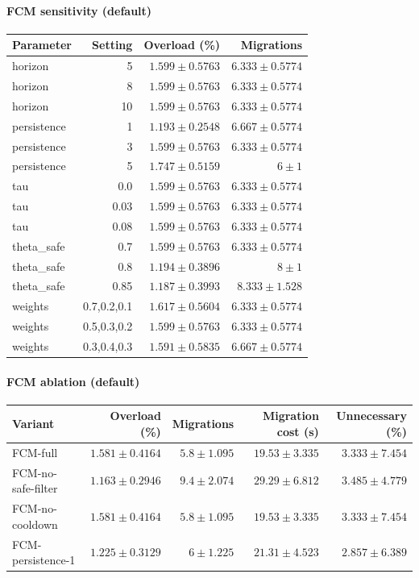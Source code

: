 \paragraph{FCM sensitivity (default)}
\begin{tabular}{lrrr}
\hline
Parameter & Setting & Overload (\%) & Migrations \\
\hline
horizon & 5 & $1.599 \pm 0.5763$ & $6.333 \pm 0.5774$ \\
horizon & 8 & $1.599 \pm 0.5763$ & $6.333 \pm 0.5774$ \\
horizon & 10 & $1.599 \pm 0.5763$ & $6.333 \pm 0.5774$ \\
persistence & 1 & $1.193 \pm 0.2548$ & $6.667 \pm 0.5774$ \\
persistence & 3 & $1.599 \pm 0.5763$ & $6.333 \pm 0.5774$ \\
persistence & 5 & $1.747 \pm 0.5159$ & $6 \pm 1$ \\
tau & 0.0 & $1.599 \pm 0.5763$ & $6.333 \pm 0.5774$ \\
tau & 0.03 & $1.599 \pm 0.5763$ & $6.333 \pm 0.5774$ \\
tau & 0.08 & $1.599 \pm 0.5763$ & $6.333 \pm 0.5774$ \\
theta_safe & 0.7 & $1.599 \pm 0.5763$ & $6.333 \pm 0.5774$ \\
theta_safe & 0.8 & $1.194 \pm 0.3896$ & $8 \pm 1$ \\
theta_safe & 0.85 & $1.187 \pm 0.3993$ & $8.333 \pm 1.528$ \\
weights & 0.7,0.2,0.1 & $1.617 \pm 0.5604$ & $6.333 \pm 0.5774$ \\
weights & 0.5,0.3,0.2 & $1.599 \pm 0.5763$ & $6.333 \pm 0.5774$ \\
weights & 0.3,0.4,0.3 & $1.591 \pm 0.5835$ & $6.667 \pm 0.5774$ \\
\hline
\end{tabular}


\paragraph{FCM ablation (default)}
\begin{tabular}{lrrrr}
\hline
Variant & Overload (\%) & Migrations & Migration cost (s) & Unnecessary (\%) \\
\hline
FCM-full & $1.581 \pm 0.4164$ & $5.8 \pm 1.095$ & $19.53 \pm 3.335$ & $3.333 \pm 7.454$ \\
FCM-no-safe-filter & $1.163 \pm 0.2946$ & $9.4 \pm 2.074$ & $29.29 \pm 6.812$ & $3.485 \pm 4.779$ \\
FCM-no-cooldown & $1.581 \pm 0.4164$ & $5.8 \pm 1.095$ & $19.53 \pm 3.335$ & $3.333 \pm 7.454$ \\
FCM-persistence-1 & $1.225 \pm 0.3129$ & $6 \pm 1.225$ & $21.31 \pm 4.523$ & $2.857 \pm 6.389$ \\
\hline
\end{tabular}
